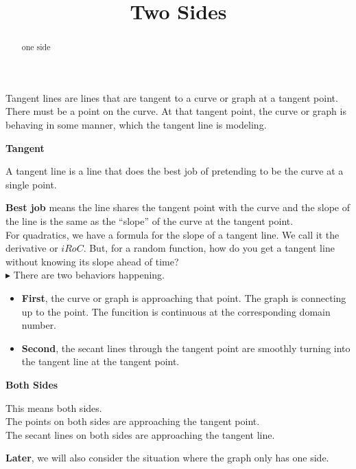 \documentclass{ximera}
\title{Two Sides}
\begin{document}
\begin{abstract}
one side
\end{abstract}
\maketitle



Tangent lines are lines that are tangent to a curve or graph at a tangent point. There must be a point on the curve. At that tangent point, the curve or graph is behaving in some manner, which the tangent line is modeling.  \\

\begin{idea} \textbf{\textcolor{blue!55!black}{Tangent}}


A tangent line is a line that does the best job of pretending to be the curve at a single point.
\end{idea}


\textbf{Best job} means the line shares the tangent point with the curve and the slope of the line is the same as the ``slope'' of the curve at the tangent point. \\


For quadratics, we have a formula for the slope of a tangent line. We call it the derivative or $iRoC$. But, for a random function, how do you get a tangent line without knowing its slope ahead of time? \\


\textbf{\textcolor{red!90!darkgray}{$\blacktriangleright$}} There are two behaviors happening. \\



\begin{itemize}
\item \textbf{First}, the curve or graph is approaching that point. The graph is connecting up to the point. The funcition is continuous at the corresponding domain number.\\
\item \textbf{Second}, the secant lines through the tangent point are smoothly turning into the tangent line at the tangent point. \\
\end{itemize}



\begin{warning} \textbf{\textcolor{red!80!black}{Both Sides}}

This means both sides. \\

The points on both sides are approaching the tangent point. \\

The secant lines on both sides are approaching the tangent line.

\end{warning}
\textbf{Later}, we will also consider the situation where the graph only has one side. \\
\end{document}
